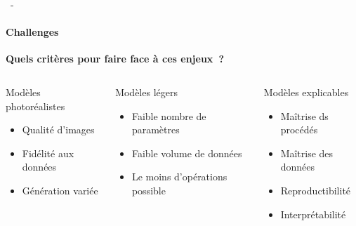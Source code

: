 \documentclass[aspectratio=169, 22pt]{beamer}
\begin{document}
\begin{frame}{\secname~- \subsecname}
  \framesubtitle{Challenges}
  \begin{center}
    \textbf{Quels critères pour faire face à ces enjeux ?}
  \end{center}
  \begin{columns}
    \begin{column}{0.33\linewidth}
      \begin{block}{Modèles photoréalistes}
        \begin{itemize}
        \item \small Qualité d'images
        \item \small Fidélité aux données
        \item \small Génération variée
        \end{itemize}
      \end{block}
      \vfill
    \end{column}
    \begin{column}{0.33\linewidth}
      \begin{block}{Modèles légers}        
        \begin{itemize}
        \item \small Faible nombre de paramètres
        \item \small Faible volume de données
        \item \small Le moins d'opérations possible
        \end{itemize}
      \end{block}
      \vfill
    \end{column}
    \begin{column}{0.33\linewidth}
      \begin{block}{Modèles explicables}
        \begin{itemize}
        \item \small Maîtrise ds procédés
        \item \small Maîtrise des données
        \item \small Reproductibilité
        \item \small Interprétabilité
        \end{itemize}
      \end{block}      
    \end{column}
  \end{columns}
    
\end{frame}
\end{document}

